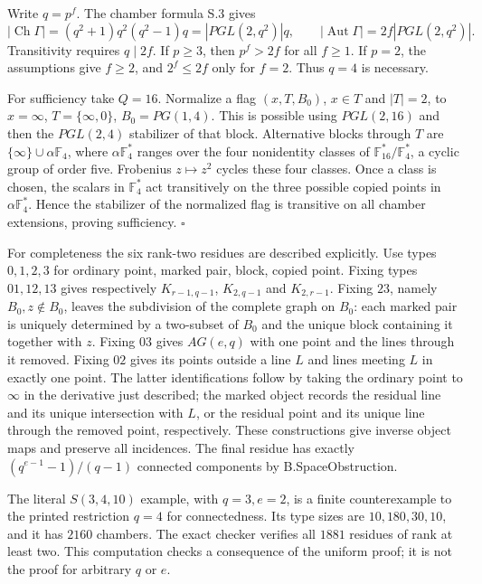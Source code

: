 Write $q=p^f$. The chamber formula S.3 gives
\[
|\operatorname{Ch}\Gamma|=(q^2+1)q^2(q^2-1)q
 =|PGL(2,q^2)|q,
\qquad
|\operatorname{Aut}\Gamma|=2f|PGL(2,q^2)|.
\]
Transitivity requires $q\mid2f$. If $p\geq3$, then $p^f>2f$ for all
$f\geq1$. If $p=2$, the assumptions give $f\geq2$, and $2^f\leq2f$
only for $f=2$. Thus $q=4$ is necessary.

For sufficiency take $Q=16$. Normalize a flag $(x,T,B_0)$, $x\in T$
and $|T|=2$, to $x=\infty$, $T=\{\infty,0\}$,
$B_0=PG(1,4)$. This is possible using $PGL(2,16)$ and then the
$PGL(2,4)$ stabilizer of that block. Alternative blocks through $T$
are $\{\infty\}\cup\alpha\mathbb F_4$, where
$\alpha\mathbb F_4^*$ ranges over the four nonidentity classes of
$\mathbb F_{16}^*/\mathbb F_4^*$, a cyclic group of order five.
Frobenius $z\mapsto z^2$ cycles these four classes. Once a class is
chosen, the scalars in $\mathbb F_4^*$ act transitively on the three
possible copied points in $\alpha\mathbb F_4^*$. Hence the stabilizer
of the normalized flag is transitive on all chamber extensions, proving
sufficiency. \hfill$\square$

For completeness the six rank-two residues are described explicitly.
Use types $0,1,2,3$ for ordinary point, marked pair, block, copied point.
Fixing types $01,12,13$ gives respectively
$K_{r-1,q-1}$, $K_{2,q-1}$ and $K_{2,r-1}$.
Fixing $23$, namely $B_0,z\notin B_0$, leaves the subdivision of the
complete graph on $B_0$: each marked pair is uniquely determined by a
two-subset of $B_0$ and the unique block containing it together with $z$.
Fixing $03$ gives $AG(e,q)$ with one point and the lines through it
removed. Fixing $02$ gives its points outside a line $L$ and lines
meeting $L$ in exactly one point. The latter identifications follow by
taking the ordinary point to $\infty$ in the derivative just described;
the marked object records the residual line and its unique intersection
with $L$, or the residual point and its unique line through the removed
point, respectively. These constructions give inverse object maps and
preserve all incidences. The final residue has exactly
$(q^{e-1}-1)/(q-1)$ connected components by B.SpaceObstruction.

The literal $S(3,4,10)$ example, with $q=3,e=2$, is a finite
counterexample to the printed restriction $q=4$ for connectedness.
Its type sizes are $10,180,30,10$, and it has $2160$ chambers.
The exact checker verifies all $1881$ residues of rank at least two.
This computation checks a consequence of the uniform proof; it is not
the proof for arbitrary $q$ or $e$.
